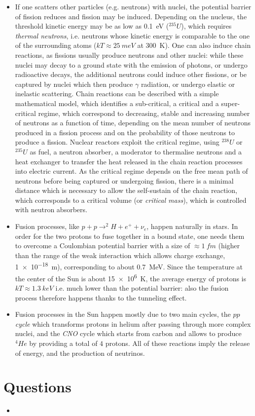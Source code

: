 \begin{itemize}
    \item If one scatters other particles (e.g. neutrons) with nuclei, the potential barrier of fission reduces and fission may be induced. Depending on the nucleus, the threshold kinetic energy may be as low as \SI{0.1}{eV} ($^{235}U$), which requires \emph{thermal neutrons}, i.e. neutrons whose kinetic energy is comparable to the one of the surrounding atoms ($kT\approx\SI{25}{meV}$ at \SI{300}{K}). One can also induce chain reactions, as fissions usually produce neutrons and other nuclei: while these nuclei may decay to a ground state with the emission of photons, or undergo radioactive decays, the additional neutrons could induce other fissions, or be captured by nuclei which then produce $\gamma$ radiation, or undergo elastic or inelastic scattering. Chain reactions can be described with a simple mathematical model, which identifies a sub-critical, a critical and a super-critical regime, which correspond to decreasing, stable and increasing number of neutrons as a function of time, depending on the mean number of neutrons produced in a fission process and on the probability of those neutrons to produce a fission. Nuclear reactors exploit the critical regime, using $^{238}U$ or $^{235}U$ as fuel, a neutron absorber, a moderator to thermalise neutrons and a heat exchanger to transfer the heat released in the chain reaction processes into electric current. As the critical regime depends on the free mean path of neutrons before being captured or undergoing fission, there is a minimal distance which is necessary to allow the self-sustain of the chain reaction, which corresponds to a critical volume (or \emph{critical mass}), which is controlled with neutron absorbers.
    \item Fusion processes, like $p+p\to ^{2}H + e^+ + \nu_e$, happen naturally in stars. In order for the two protons to fuse together in a bound state, one needs them to overcome a Coulombian potential barrier with a size of $\approx \SI{1}{fm}$ (higher than the range of the weak interaction which allows charge exchange, \SI{1e-18}{m}), corresponding to about \SI{0.7}{MeV}. Since the temperature at the center of the Sun is about \SI{15e6}{K}, the average energy of protons is $kT\approx\SI{1.3}{keV}$ i.e. much lower than the potential barrier: also the fusion process therefore happens thanks to the tunneling effect.
    \item Fusion processes in the Sun happen mostly due to two main cycles, the \emph{$pp$ cycle} which transforms protons in helium after passing through more complex nuclei, and the \emph{CNO} cycle which starts from carbon and allows to produce $^4He$ by providing a total of $4$ protons. All of these reactions imply the release of energy, and the production of neutrinos.
\end{itemize}
\section*{Questions}
\begin{itemize}
    \item 
\end{itemize}